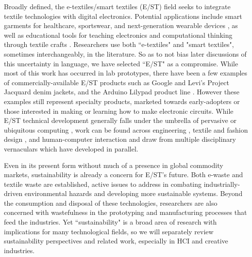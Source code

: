 \documentclass[manuscript,review,anonymous]{acmart}
\begin{document}
Broadly defined, the e-textiles/smart textiles (E/ST) field seeks to integrate textile technologies with digital electronics. Potential applications include smart garments for healthcare, sportswear, and
next-generation wearable devices \cite{stoppa_wearable_2014},
as well as educational tools for teaching electronics and computational thinking through textile crafts \cite{kafai_ethnocomputing_2014, buechley_lilypad-edu_2008}. Researchers use both ``e-textiles" and "smart textiles", sometimes interchangeably, in the literature. So as to not bias later discussions of this uncertainty in language, we have selected ``E/ST" as a compromise.
While most of this work has occurred in lab prototypes, there have been a few examples of commercially-available E/ST products such as Google and Levi's Project Jacquard denim jackets, and the Arduino Lilypad product line \cite{poupyrev_project_2016, buechley_lilypad_2008}
. However these examples still represent specialty products, marketed towards early-adopters or those interested in making or learning how to make electronic circuits.
While E/ST technical development generally falls under the umbrella of pervasive or ubiquitous computing \cite{marculescu_electronic_2003}, work can be found across engineering \cite{liu_advances_2018, afroj_engineering_2019, lund_roll--roll_2018} %
, textile and fashion design \cite{mcquillan_hybrid_2019, fairburn_spheres_2016} %
, and human-computer interaction \cite{nachtigall_five-year_2018, posch_etextiles_2019} %
and draw from multiple disciplinary vernaculars which have developed in parallel. 

Even in its present form without much of a presence in global commodity markets, sustainability is already a concern for E/ST's future. Both e-waste \cite{robinson_e-waste:_2009,forti_global_2020} and textile waste \cite{sandin_environmental_2018,muthu_textiles_2017} are established, active issues to address in combating industrially-driven environmental hazards and developing more sustainable systems. Beyond the consumption and disposal of these technologies, researchers are also concerned with wastefulness in the prototyping \cite{dew_designing_2019, wall_scrappy_2021} %
and manufacturing \cite{machado_sustainable_2020, schoggl_narrative_2020}
processes that feed the industries. 
Yet ``sustainability" is a broad area of research with implications for many technological fields, so we will separately review sustainability perspectives and related work, especially in HCI and creative industries.
\end{document}
